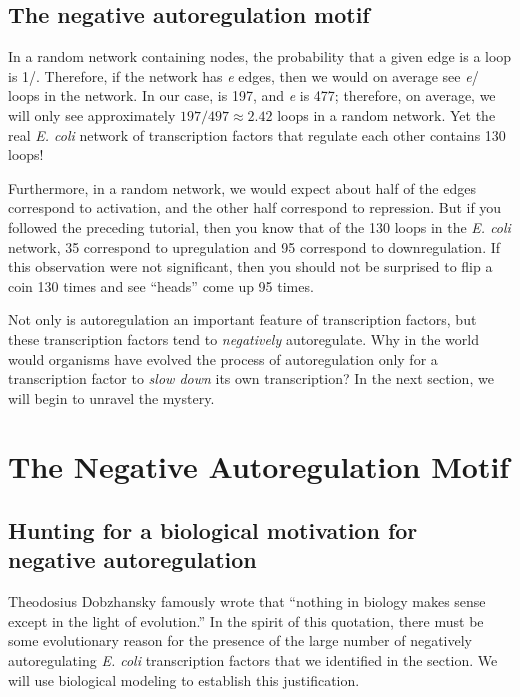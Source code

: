 \FloatBarrier
{}
\subsection{The negative autoregulation motif}

In a random network containing  nodes, the probability that a given edge is a loop is 1/. Therefore, if the network has \textit{e} edges, then we would on average see \textit{e}/ loops in the network. In our case,  is 197, and \textit{e} is 477; therefore, on average, we will only see approximately $197/497 \approx 2.42$ loops in a random network. Yet the real \textit{E. coli} network of transcription factors that regulate each other contains 130 loops!

Furthermore, in a random network, we would expect about half of the edges correspond to activation, and the other half correspond to repression. But if you followed the preceding tutorial, then you know that of the 130 loops in the \textit{E. coli} network, 35 correspond to upregulation and 95 correspond to downregulation. If this observation were not significant, then you should not be surprised to flip a coin 130 times and see ``heads'' come up 95 times.

Not only is autoregulation an important feature of transcription factors, but these transcription factors tend to \textit{negatively} autoregulate. Why in the world would organisms have evolved the process of autoregulation only for a transcription factor to \textit{slow down} its own transcription? In the next section, we will begin to unravel the mystery.\\


\FloatBarrier
{}

\section{The Negative Autoregulation Motif}
\label{sec:the_negative_autoregulation_motif}

\subsection{Hunting for a biological motivation for negative autoregulation}

Theodosius Dobzhansky famously wrote that ``nothing in biology makes sense except in the light of evolution.'' In the spirit of this quotation, there must be some evolutionary reason for the presence of the large number of negatively autoregulating \textit{E. coli} transcription factors that we identified in the section. We will use biological modeling to establish this justification.

